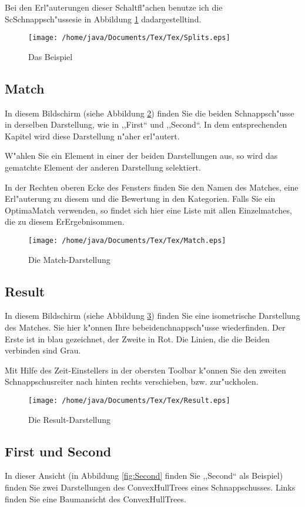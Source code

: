 Bei den Erl"auterungen dieser Schaltfl"achen benutze ich die ScSchnappsch"ussesie in Abbildung \ref{fig:Splits} dadargestelltind.
\begin{figure}
   \centering
   \texttt{[image: /home/java/Documents/Tex/Tex/Splits.eps]}
   \caption{Das Beispiel}
   \label{fig:Splits}
\end{figure}
\subsection{Match}
In diesem Bildschirm (siehe Abbildung \ref{fig:Match}) finden Sie die beiden Schnappsch"usse in derselben Darstellung, wie in ,,First`` und ,,Second``. In dem entsprechenden Kapitel wird diese Darstellung n"aher erl"autert. 

W"ahlen Sie ein Element in einer der beiden Darstellungen aus, so wird das gematchte Element der anderen Darstellung selektiert. 

In der Rechten oberen Ecke des Fensters finden Sie den Namen des Matches, eine Erl"auterung zu diesem und die Bewertung in den Kategorien. Falls Sie ein OptimaMatch verwenden, so findet sich hier eine Liste mit allen Einzelmatches, die zu diesem ErErgebnisommen.
\begin{figure}
   \centering
   \texttt{[image: /home/java/Documents/Tex/Tex/Match.eps]}
   \caption{Die Match-Darstellung}
   \label{fig:Match}
\end{figure}

\subsection{Result}
In diesem Bildschirm (siehe Abbildung \ref{fig:Result}) finden Sie eine isometrische Darstellung des Matches. Sie hier k"onnen Ihre bebeidenchnappsch"usse wiederfinden. Der Erste ist in blau gezeichnet, der Zweite in Rot. Die Linien, die die Beiden verbinden sind Grau. 

Mit Hilfe des Zeit-Einstellers in der obersten Toolbar k"onnen Sie den zweiten Schnappschusreiter nach hinten rechts verschieben, bzw. zur"uckholen. 

\begin{figure}
   \centering
   \texttt{[image: /home/java/Documents/Tex/Tex/Result.eps]}
   \caption{Die Result-Darstellung}
   \label{fig:Result}
\end{figure}
\subsection{First und Second}
In dieser Ansicht (in Abbildung \ref{fig:Second} finden Sie ,,Second`` als Beispiel) finden Sie zwei Darstellungen des ConvexHullTrees eines Schnappschusses. Links finden Sie eine Baumansicht des ConvexHullTrees.

